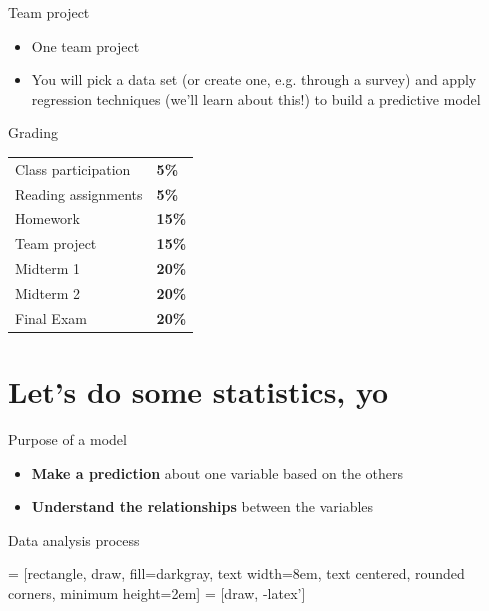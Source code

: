 \documentclass{beamer}\usepackage[]{graphicx}\usepackage[]{color}
\begin{document}
\begin{darkframes}
    \begin{frame}{Team project}
      \begin{itemize}
        \item One team project
        \item You will pick a data set (or create one, e.g. through a survey) and apply regression techniques (we'll learn about this!) to build a predictive model
      \end{itemize}
    \end{frame}

    \begin{frame}{Grading}
      \begin{center}
        \begin{tabular}{ll}
          Class participation & \textbf{5\%}  \\
          Reading assignments & \textbf{5\%}  \\
          Homework   & \textbf{15\%} \\
          Team project & \textbf{15\%} \\
          Midterm 1  & \textbf{20\%} \\
          Midterm 2  & \textbf{20\%} \\
          Final Exam & \textbf{20\%} \\
        \end{tabular}
      \end{center}
    \end{frame}

    \section{Let's do some statistics, yo}

    \begin{frame}{Purpose of a model}
      \begin{itemize}
        \item \textbf{Make a prediction} about one variable based on the others
        \item \textbf{Understand the relationships} between the variables
      \end{itemize}
    \end{frame}

    \begin{frame}{Data analysis process}
      \begin{center}
         = [rectangle, draw, fill=darkgray,
            text width=8em, text centered, rounded corners, minimum height=2em]
         = [draw, -latex']


\end{center}
\end{frame}
\end{darkframes}
\end{document}
